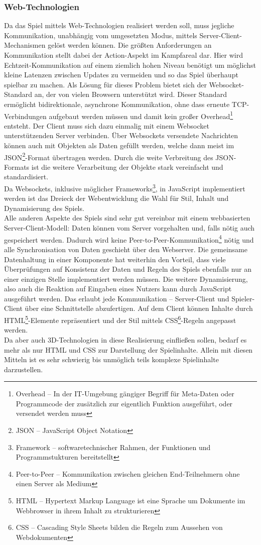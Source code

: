 \subsubsection{Web-Technologien}
Da das Spiel mittels Web-Technologien realisiert werden soll, muss jegliche Kommunikation, unabhängig vom umgesetzten Modus, mittels Server-Client-Mechanismen gelöst werden können. Die größten Anforderungen an Kommunikation stellt dabei der Action-Aspekt im Kampfareal dar. Hier wird Echtzeit-Kommunikation auf einem ziemlich hohen Niveau benötigt um möglichst kleine Latenzen zwischen Updates zu vermeiden und so das Spiel überhaupt spielbar zu machen. Als Lösung für dieses Problem bietet sich der Websocket-Standard an, der von vielen Browsern unterstützt wird. Dieser Standard ermöglicht bidirektionale, asynchrone Kommunikation, ohne dass erneute TCP-Verbindungen aufgebaut werden müssen und damit kein großer Overhead\footnote{Overhead -- In der IT-Umgebung gängiger Begriff für Meta-Daten oder Programmcode der zusätzlich zur eigentlich Funktion ausgeführt, oder versendet werden muss} entsteht. Der Client muss sich dazu einmalig mit einem Websocket unterstützenden Server verbinden. Über Websockets versendete Nachrichten können auch mit Objekten als Daten gefüllt werden, welche dann meist im JSON\footnote{JSON -- JavaScript Object Notation}-Format übertragen werden. Durch die weite Verbreitung des JSON-Formats ist die weitere Verarbeitung der Objekte stark vereinfacht und standardisiert.\\
Da Websockets, inklusive möglicher Frameworks\footnote{Framework -- softwaretechnischer Rahmen, der Funktionen und Programmstukturen bereitstellt}, in JavaScript implementiert werden ist das Dreieck der Webentwicklung die Wahl für Stil, Inhalt und Dynamisierung des Spiels.\\
Alle anderen Aspekte des Spiels sind sehr gut vereinbar mit einem webbasierten Server-Client-Modell:
Daten können vom Server vorgehalten und, falls nötig auch gespeichert werden. Dadurch wird keine Peer-to-Peer-Kommunikation\footnote{Peer-to-Peer -- Kommunikation zwischen gleichen End-Teilnehmern ohne einen Server als Medium} nötig und alle Synchronisation von Daten geschieht über den Webserver. Die gemeinsame Datenhaltung in einer Komponente hat weiterhin den Vorteil, dass viele Überprüfungen auf Konsistenz der Daten und Regeln des Spiels ebenfalls nur an einer einzigen Stelle implementiert werden müssen.
Die weitere Dynamisierung, also auch die Reaktion auf Eingaben eines Nutzers kann durch JavaScript ausgeführt werden. Das erlaubt jede Kommunikation -- Server-Client und Spieler-Client über eine Schnittstelle abzufertigen.
Auf dem Client können Inhalte durch HTML\footnote{HTML -- Hypertext Markup Language ist eine Sprache um Dokumente im Webbrowser in ihrem Inhalt zu strukturieren }-Elemente repräsentiert und der Stil mittels CSS\footnote{CSS -- Cascading Style Sheets bilden die Regeln zum Aussehen von Webdokumenten}-Regeln angepasst werden.\\
Da aber auch 3D-Technologien in diese Realisierung einfließen sollen, bedarf es mehr als nur HTML und CSS zur Darstellung der Spielinhalte. Allein mit diesen Mitteln ist es sehr schwierig bis unmöglich teils komplexe Spielinhalte darzustellen.
